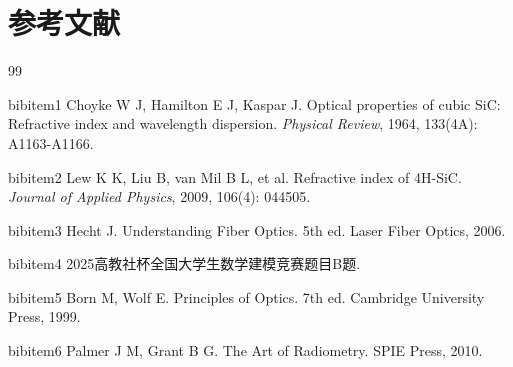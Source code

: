\documentclass[12pt,a4paper]{article}
\begin{document}
\section{参考文献}

\begin{thebibliography}{99}

bibitem{1} Choyke W J, Hamilton E J, Kaspar J. Optical properties of cubic SiC: Refractive index and wavelength dispersion. \textit{Physical Review}, 1964, 133(4A): A1163-A1166.

bibitem{2} Lew K K, Liu B, van Mil B L, et al. Refractive index of 4H-SiC. \textit{Journal of Applied Physics}, 2009, 106(4): 044505.

bibitem{3} Hecht J. Understanding Fiber Optics. 5th ed. Laser Fiber Optics, 2006.

bibitem{4} 2025高教社杯全国大学生数学建模竞赛题目B题.

bibitem{5} Born M, Wolf E. Principles of Optics. 7th ed. Cambridge University Press, 1999.

bibitem{6} Palmer J M, Grant B G. The Art of Radiometry. SPIE Press, 2010.
\end{thebibliography}
\end{document}
